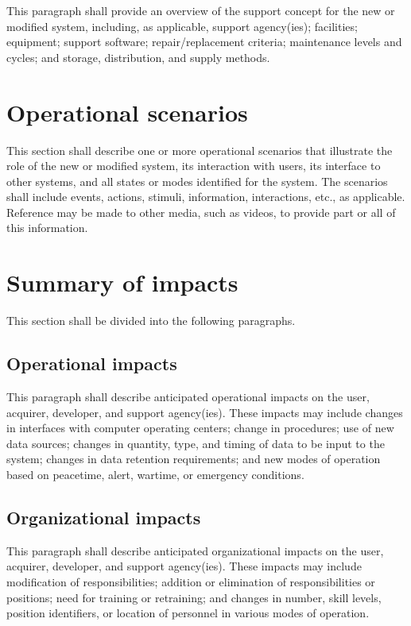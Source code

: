 \documentclass{fidata-report-template}
\begin{document}
This paragraph shall provide an overview of the support concept for the
new or modified system, including, as applicable, support agency(ies);
facilities; equipment; support software; repair/replacement criteria;
maintenance levels and cycles; and storage, distribution, and supply
methods.

\section{Operational scenarios}

This section shall describe one or more operational scenarios that
illustrate the role of the new or modified system, its interaction with
users, its interface to other systems, and all states or modes
identified for the system. The scenarios shall include events, actions,
stimuli, information, interactions, etc., as applicable. Reference may
be made to other media, such as videos, to provide part or all of this
information.

\section{Summary of impacts}

This section shall be divided into the following paragraphs.

\subsection{Operational impacts}

This paragraph shall describe anticipated operational impacts on the
user, acquirer, developer, and support agency(ies). These impacts may
include changes in interfaces with computer operating centers; change in
procedures; use of new data sources; changes in quantity, type, and
timing of data to be input to the system; changes in data retention
requirements; and new modes of operation based on peacetime, alert,
wartime, or emergency conditions.

\subsection{Organizational impacts}

This paragraph shall describe anticipated organizational impacts on the
user, acquirer, developer, and support agency(ies). These impacts may
include modification of responsibilities; addition or elimination of
responsibilities or positions; need for training or retraining; and
changes in number, skill levels, position identifiers, or location of
personnel in various modes of operation.
\end{document}
